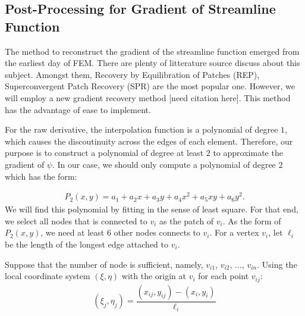 \documentclass[12pt]{book}
\theoremstyle{bfnote}
\theoremstyle{bfnote}
\begin{document}
\subsection{Post-Processing for Gradient of Streamline Function} %
\label{subsec:Post-Processing_for_Gradient_of_Streamline_Function}
The method to reconstruct the gradient of the streamline function emerged from the earliest day of FEM. There are plenty of litterature source discuss about this subject. Amongst them, Recovery by Equilibration of Patches (REP), Superconvergent Patch Recovery (SPR) are the most popular one. However, we will employ a new gradient recovery method [need citation here]. This method has the advantage of ease to implement.

For the raw derivative, the interpolation function is a polynomial of degree $1$, which causes the discoutinuity across the edges of each element. Therefore, our purpose is to construct a polynomial of degree at least $2$ to approximate the gradient of $\psi$. In our case, we should only compute a polynomial of degree $2$ which has the form:

\begin{align}
    P_2(x,y) = a_1 + a_2 x + a_3 y + a_4 x^2 + a_5 xy + a_6 y^2.
\end{align}
We will find this polynomial by fitting in the sense of least square. For that end, we select all nodes that is connected to $v_i$ as the patch of $v_i$. As the form of $P_2(x,y)$, we need at least 6 other nodes connects to $v_i$. For a vertex $v_i$, let $\ell_i$ be the length of the longest edge attached to $v_i$. 

Suppose that the number of node is sufficient, namely, $v_{i1}$, $v_{i2}$, $\ldots$, $v_{in}$. Using the local coordinate system $(\xi, \eta)$ with the origin at $v_i$ for each point $v_{ij}$:
\begin{align}
    (\xi_j, \eta_j) = \dfrac{(x_{ij},y_{ij}) - (x_i,y_i)}{\ell_i}
\end{align}
\end{document}
